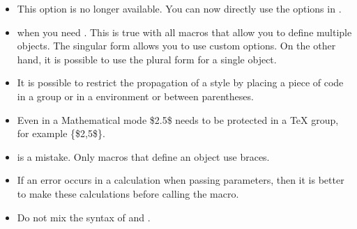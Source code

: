 \begin{itemize}\setlength{\itemsep}{10pt}

\item {}

This option is no longer available. You can now directly use the options in \TIKZ.

\item {}

 when you need . This is
true with all macros that allow you to define multiple objects. The singular
form allows you to use custom options. On the other hand, it is possible to use
the plural form for a single object.

\item {}

It is possible to restrict the propagation of a style by placing a piece of code
in a group or in a
 environment or between parentheses.

\item {}

Even in a Mathematical mode \$2.5\$ needs
to be protected in a TeX group, for example \{\$2,5\$\}.

\item {} is a mistake. Only macros that
define an object use braces.

\item If an error occurs in a calculation when passing parameters, then it is
better to make these calculations before calling the macro.

\item Do not mix the syntax of  and .

\end{itemize}

\endinput
